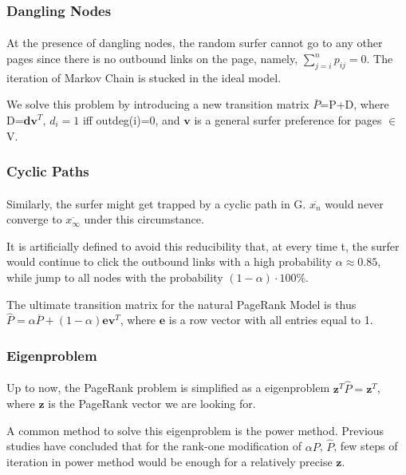 \documentclass[a0,portrait]{a0poster}
\begin{document}
\begin{multicols}{2}
        \subsubsection*{Dangling Nodes}
        \paragraph{}
        At the presence of dangling nodes, the random surfer cannot go to any other pages since there is no outbound links on the page, namely, $\sum^n_{j=i}p_{ij}=0$. 
        The iteration of Markov Chain is stucked in the ideal model.
        
        We solve this problem by introducing a new transition matrix $\overline{P}$=P+D, where D=$\textbf{dv}^T$, $d_i=1$ iff outdeg(i)=0, and $\textbf{v}$ is a general surfer preference for pages $\in$ V.
        \subsubsection*{Cyclic Paths}
        \paragraph{}
        Similarly, the surfer might get trapped by a cyclic path in G. $\overline{x_n}$ would never converge to $\overline{x_\infty}$ under this circumstance.
        
        It is artificially defined to avoid this reducibility that, at every time t, the surfer would continue to click the outbound links with a high probability $\alpha\approx0.85$, while jump to all nodes with the probability $(1-\alpha)\cdot100\%$.
        
        The ultimate transition matrix for the natural PageRank Model is thus
        $\hat{P}=\alpha\overline{P}+(1-\alpha)\textbf{ev}^T$,
        where $\textbf{e}$ is a row vector with all entries equal to 1.
        \subsubsection*{Eigenproblem}
        \paragraph{}
        Up to now, the PageRank problem is simplified as a eigenproblem $\textbf{z}^T\hat{P}=\textbf{z}^T$, where $\textbf{z}$ is the PageRank vector we are looking for.
        
        A common method to solve this eigenproblem is the power method. Previous studies have concluded that for the rank-one modification of $\alpha P$, $\hat{P}$, few steps of iteration in power method would be enough for a relatively precise $\textbf{z}$.
        

\end{multicols}
\end{document}
